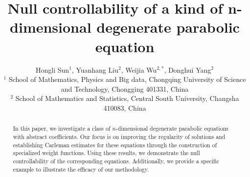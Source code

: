 \documentclass[9pt,reqno]{amsart}
\theoremstyle{plain}
\numberwithin{equation}{section}
\numberwithin{theorem}{section}
\begin{document}
	
	\title{Null controllability of a kind of n-dimensional degenerate parabolic equation}
	
	
	

	
	\author{\sffamily Hongli Sun$^{1}$, Yuanhang Liu$^{2}$, Weijia Wu$^{2,*}$, Donghui Yang$^{2}$   \\
		{\sffamily\small $^1$ School of Mathematics, Physics and Big data, Chongqing University of Science and Technology,
			 Chongging 401331, China }\\
		{\sffamily\small $^2$ School of Mathematics and Statistics, Central South University, Changsha 410083, China\\ }
	}
	
	
	
%	
	

	
	
	\keywords{}
	
	\maketitle
	
	\begin{abstract}
		In this paper, we investigate a class of $n$-dimensional degenerate parabolic equations with abstract coefficients. Our focus is on improving the regularity of solutions and establishing Carleman estimates for these equations through the construction of specialized weight functions. Using these results, we demonstrate the null controllability of the corresponding equations. Additionally, we provide a specific example to illustrate the efficacy of our methodology.
		
	\end{abstract}
	
\end{document}

